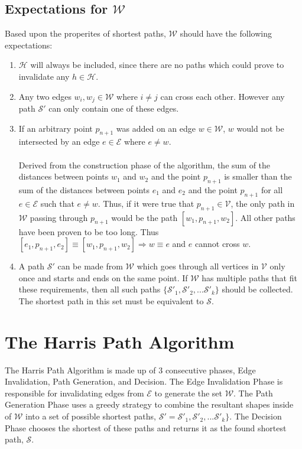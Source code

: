 \documentclass[12pt]{article}
\begin{document}
\subsection{Expectations for $\mathcal{W}$}\label{subsec:exp_w}
Based upon the properites of shortest paths, $\mathcal{W}$ should have the following expectations:
\begin{enumerate}
\item $\mathcal{H}$ will always be included, since there are no paths
which could prove to invalidate any $h \in \mathcal{H}$.
\item Any two edges $w_i,w_j \in \mathcal{W}$ where $i \neq j$ can cross each other.
However any path $\mathcal{S}'$ can only contain one of these edges.
\item If an arbitrary point $p_{n+1}$ was added on an edge $w \in \mathcal{W}$,
$w$ would not be intersected by an edge $e \in \mathcal{E}$ where $e \neq w$.
\\\\
Derived from the construction phase of the algorithm,
the sum of the distances between points
$w_1$ and $w_2$ and the point $p_{n+1}$
is smaller than the sum of the distances between points
$e_1$ and $e_2$ and the point $p_{n+1}$ for all $e \in \mathcal{E}$ such that $e \neq w$.
Thus, if it were true that $p_{n+1} \in \mathcal{V}$,
the only path in $\mathcal{W}$ passing
through $p_{n + 1}$ would be the path $[w_1,p_{n+1},w_2]$.
All other paths have been proven to be too long.
Thus $[e_1,p_{n+1},e_2] \equiv [w_1,p_{n+1},w_2] \Rightarrow w \equiv e$
and $e$ cannot cross $w$.
\item A path $\mathcal{S}'$ can be made from $\mathcal{W}$
which goes through all vertices in $\mathcal{V}$ only once
and starts and ends on the same point.
If $\mathcal{W}$ has multiple paths that fit these requirements, then all such paths
$\{\mathcal{S}'_1, \mathcal{S}'_2, ... \mathcal{S}'_k\}$ should be collected.
The shortest path in this set must be equivalent to $\mathcal{S}$.
\end{enumerate}

\section{The Harris Path Algorithm}
The Harris Path Algorithm is made up of 3 consecutive phases,
Edge Invalidation, Path Generation, and Decision.
The Edge Invalidation Phase is
responsible for invalidating edges from $\mathcal{E}$ to generate the set
$\mathcal{W}$. The Path Generation Phase uses a greedy strategy to combine the resultant
shapes inside of $\mathcal{W}$ into a set of possible shortest paths,
$\mathcal{S}' = \mathcal{S}'_1, \mathcal{S}'_2, ... \mathcal{S}'_k\}$.
The Decision Phase chooses the shortest of these paths and returns it as the
found shortest path, $\mathcal{S}$.
\end{document}
